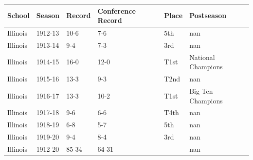 \documentclass{article}
\begin{document}
\begin{tabular}{llllll}
\toprule
School & Season & Record & Conference Record & Place & Postseason \\
\midrule
Illinois & 1912-13 & 10-6 & 7-6 & 5th & nan \\
Illinois & 1913-14 & 9-4 & 7-3 & 3rd & nan \\
Illinois & 1914-15 & 16-0 & 12-0 & T1st & National Champions \\
Illinois & 1915-16 & 13-3 & 9-3 & T2nd & nan \\
Illinois & 1916-17 & 13-3 & 10-2 & T1st & Big Ten Champions \\
Illinois & 1917-18 & 9-6 & 6-6 & T4th & nan \\
Illinois & 1918-19 & 6-8 & 5-7 & 5th & nan \\
Illinois & 1919-20 & 9-4 & 8-4 & 3rd & nan \\
Illinois & 1912-20 & 85-34 & 64-31 & - & nan \\
\bottomrule
\end{tabular}
\end{document}
